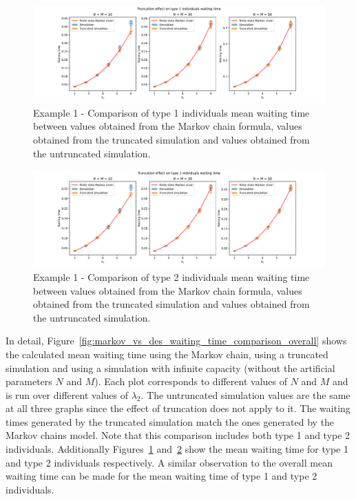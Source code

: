 \begin{figure}[H]
    \includegraphics[width=\textwidth]{chapters/03_queueing_model/Bin/numeric_results_and_timings/truncation_effect/waiting_time_type_1.pdf}
    \caption{
        Example 1 - Comparison of type 1 individuals mean waiting time between
        values
        obtained from the Markov chain formula, values obtained from the
        truncated simulation and values obtained from the untruncated
        simulation.
    }
    \label{fig:markov_vs_des_waiting_time_comparison_type_1}
\end{figure}

\begin{figure}[H]
    \includegraphics[width=\textwidth]{chapters/03_queueing_model/Bin/numeric_results_and_timings/truncation_effect/waiting_time_type_2.pdf}
    \caption{
        Example 1 - Comparison of type 2 individuals mean waiting time between
        values
        obtained from the Markov chain formula, values obtained from the
        truncated simulation and values obtained from the untruncated
        simulation.
    }
    \label{fig:markov_vs_des_waiting_time_comparison_type_2}
\end{figure}

In detail, Figure~\ref{fig:markov_vs_des_waiting_time_comparison_overall} shows
the calculated mean waiting time using the Markov chain, using a truncated
simulation and using a simulation with infinite capacity (without the artificial
parameters \(N\) and \(M\)).
Each plot corresponds to different values of \(N\) and \(M\) and is run over
different values of \(\lambda_2\).
The untruncated simulation values are the same at all three graphs since
the effect of truncation does not apply to it.
The waiting times generated by the truncated simulation match the ones generated
by the Markov chains model.
Note that this comparison includes both type 1 and type 2 individuals.
Additionally Figures~\ref{fig:markov_vs_des_waiting_time_comparison_type_1}
and~\ref{fig:markov_vs_des_waiting_time_comparison_type_2} show the mean waiting
time for type 1 and type 2 individuals respectively.
A similar observation to the overall mean waiting time can be made for the mean
waiting time of type 1 and type 2 individuals.


